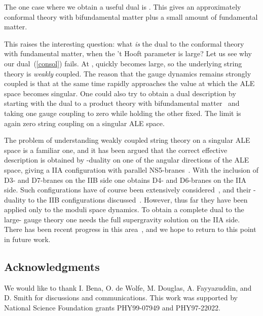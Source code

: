 \documentclass[a4paper,12pt]{article}
\renewcommand{\=}[1]{\bar{#1}}
\begin{document}
The one case where we obtain a useful dual is \coordHE{}.
This gives an approximately conformal \coordHE{} theory with
bifundamental matter plus a small amount of fundamental matter.

This raises the interesting question: what {\it is} the dual to the conformal
\coordHE{}  \coordHE{} theory with fundamental matter, when the 't Hooft parameter
\coordHE{} is large?  Let us see why our dual~(\ref{consol}) fails.  At \coordHE{},
\coordHE{} quickly becomes large, so the underlying string theory is {\it weakly}
coupled. The reason that the gauge dynamics remains strongly coupled is that at
the same time \coordHE{} rapidly approaches the value \myHighlight{$2\pi$}\coordHE{} at which the
ALE space becomes singular.  One could also try to obtain a dual description
by starting with the dual to a product theory with bifundamental
matter~\cite{GK-KN} and taking one gauge coupling to zero while holding the
other fixed.  The limit is again zero string coupling on a singular
ALE space.

The problem of understanding weakly coupled string theory on a
singular ALE space is a familiar one, and it has been argued that the correct
effective description is obtained by \coordHE{}-duality on one of the angular directions
of the ALE space, giving a IIA configuration with parallel
NS5-branes~\cite{alesing}.  With the inclusion of D3- and D7-branes on the IIB side
one obtains D4- and D6-branes on the IIA side.  Such configurations have of course
been extensively considered~\cite{mqcd}, and their \coordHE{}-duality to the IIB
configurations discussed~\cite{tdual}.  However, thus far they have been applied
only to the moduli space dynamics.  To obtain a complete dual to the large-\coordHE{}
gauge theory one needs the full supergravity solution on the IIA side.  There has
been recent progress in this area~\cite{intm5}, and we hope to return to this
point in future work.

\subsection*{Acknowledgments}

We would like to thank I. Bena, O. de Wolfe, M. Douglas, A. Fayyazuddin, and D.
Smith for discussions and communications. This work was supported by National
Science Foundation grants PHY99-07949 and PHY97-22022.
\end{document}
